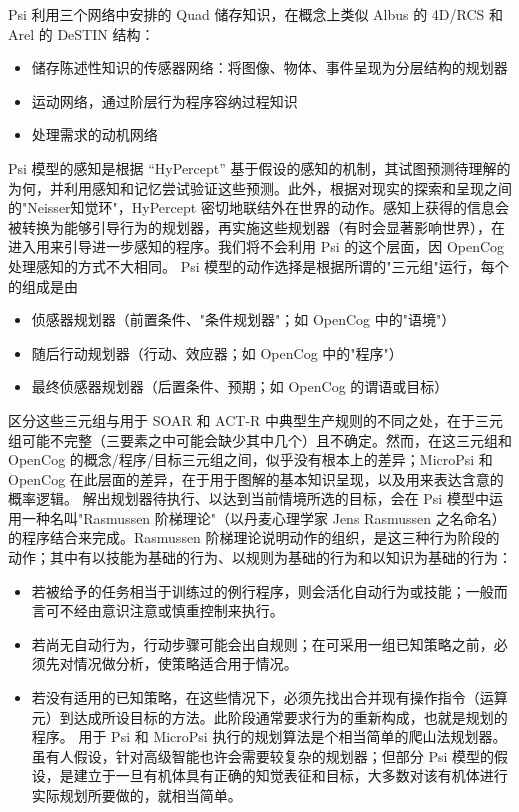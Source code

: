 Psi 利用三个网络中安排的 Quad 储存知识，在概念上类似 Albus 的 4D/RCS 和 Arel 的 DeSTIN 结构：

\begin{itemize}

\item 储存陈述性知识的传感器网络：将图像、物体、事件呈现为分层结构的规划器 
\item 运动网络，通过阶层行为程序容纳过程知识
\item 处理需求的动机网络

\end{itemize}

Psi 模型的感知是根据 “HyPercept” 基于假设的感知的机制，其试图预测待理解的为何，并利用感知和记忆尝试验证这些预测。此外，根据对现实的探索和呈现之间的"Neisser知觉环"，HyPercept 密切地联结外在世界的动作。感知上获得的信息会被转换为能够引导行为的规划器，再实施这些规划器（有时会显著影响世界），在进入用来引导进一步感知的程序。我们将不会利用 Psi 的这个层面，因 OpenCog 处理感知的方式不大相同。 
Psi 模型的动作选择是根据所谓的"三元组"运行，每个的组成是由

\begin{itemize}
\item 侦感器规划器（前置条件、"条件规划器"；如 OpenCog 中的"语境"）
\item 随后行动规划器（行动、效应器；如 OpenCog 中的"程序"） 
\item 最终侦感器规划器（后置条件、预期；如 OpenCog 的谓语或目标）
\end{itemize}

区分这些三元组与用于 SOAR 和 ACT-R 中典型生产规则的不同之处，在于三元组可能不完整（三要素之中可能会缺少其中几个）且不确定。然而，在这三元组和 OpenCog 的概念/程序/目标三元组之间，似乎没有根本上的差异；MicroPsi 和 OpenCog 在此层面的差异，在于用于图解的基本知识呈现，以及用来表达含意的概率逻辑。
解出规划器待执行、以达到当前情境所选的目标，会在 Psi 模型中运用一种名叫"Rasmussen 阶梯理论"（以丹麦心理学家 Jens Rasmussen 之名命名）的程序结合来完成。Rasmussen 阶梯理论说明动作的组织，是这三种行为阶段的动作；其中有以技能为基础的行为、以规则为基础的行为和以知识为基础的行为：

\begin{itemize}
\item 若被给予的任务相当于训练过的例行程序，则会活化自动行为或技能；一般而言可不经由意识注意或慎重控制来执行。 
\item 若尚无自动行为，行动步骤可能会出自规则；在可采用一组已知策略之前，必须先对情况做分析，使策略适合用于情况。 
\item 若没有适用的已知策略，在这些情况下，必须先找出合并现有操作指令（运算元）到达成所设目标的方法。此阶段通常要求行为的重新构成，也就是规划的程序。
用于 Psi 和 MicroPsi 执行的规划算法是个相当简单的爬山法规划器。虽有人假设，针对高级智能也许会需要较复杂的规划器；但部分 Psi 模型的假设，是建立于一旦有机体具有正确的知觉表征和目标，大多数对该有机体进行实际规划所要做的，就相当简单。
\end{itemize}


